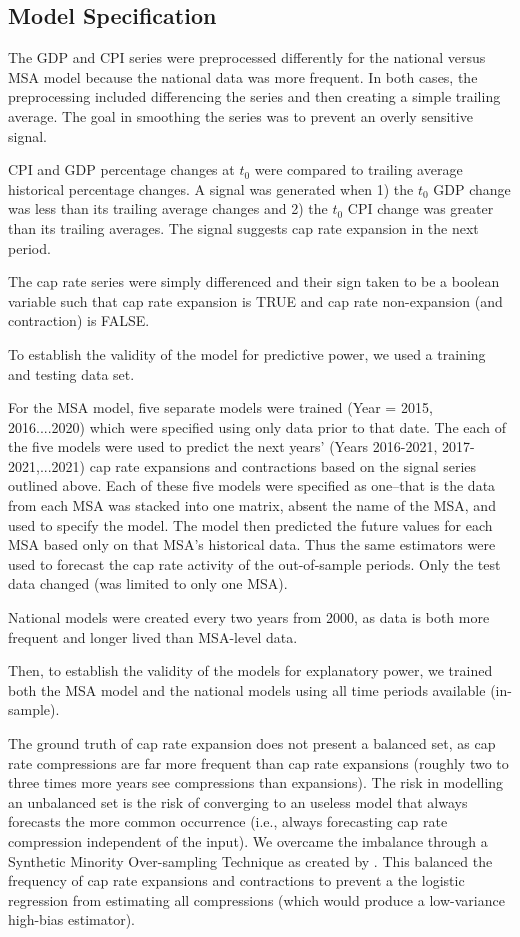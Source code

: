 \subsection{Model Specification}

The GDP and CPI series were preprocessed differently for the national versus MSA model because the national data was more frequent. In both cases, the preprocessing included differencing the series and then creating a simple trailing average. The goal in smoothing the series was to prevent an overly sensitive signal. 

CPI and GDP percentage changes at $t_0$ were compared to trailing average historical percentage changes. A  signal was generated when 1) the $t_0$ GDP change was less than its trailing average changes and 2) the $t_0$ CPI change was greater than its trailing averages. The signal suggests cap rate expansion in the next period. 

The cap rate series were simply differenced and their sign taken to be a boolean variable such that cap rate expansion is TRUE and cap rate non-expansion (and contraction) is FALSE.

To establish the validity of the model for predictive power, we used a training and testing data set.

For the MSA model, five separate models were trained (Year = 2015, 2016....2020) which were specified using only data prior to that date. The each of the five models were used to predict the next years' (Years 2016-2021, 2017-2021,...2021) cap rate expansions and contractions based on the signal series outlined above. Each of these five models were specified as one--that is the data from each MSA was stacked into one matrix, absent the name of the MSA, and used to specify the model. The model then predicted the future values for each MSA based only on that MSA's historical data. Thus the same estimators were used to forecast the cap rate activity of the out-of-sample periods. Only the test data changed (was limited to only one MSA).

National models were created every two years from 2000, as data is both more frequent and longer lived than MSA-level data. 

Then, to establish the validity of the models for explanatory power, we trained both the MSA model and the national models using all time periods available (in-sample).

The ground truth of cap rate expansion does not present a balanced set, as cap rate compressions are far more frequent than cap rate expansions (roughly two to three times more years see compressions than expansions). The risk in modelling an unbalanced set is the risk of converging to an useless model that always forecasts the more common occurrence (i.e., always forecasting cap rate compression independent of the input). We overcame the imbalance through a Synthetic Minority Over-sampling Technique as created by \citep*{SMOTE}. This balanced the frequency of cap rate expansions and contractions to prevent a the logistic regression from estimating all compressions (which would produce a low-variance high-bias estimator).

